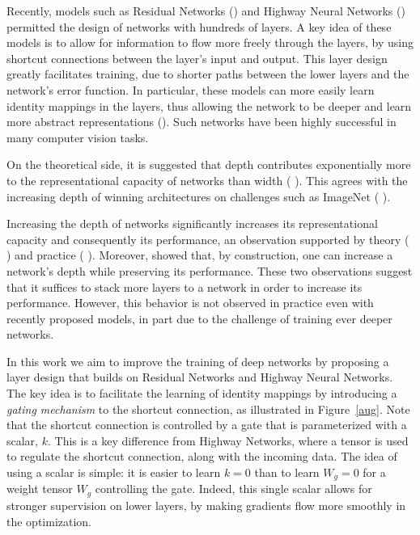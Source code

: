 \documentclass{article} %
\begin{document}
Recently, models such as Residual Networks (\cite{resnet1}) and Highway Neural Networks (\cite{highway}) permitted the design of networks with hundreds of layers. A key idea of these models is to allow for information to flow more freely through the layers, by using shortcut connections between the layer's input and output. This layer design greatly facilitates training, due to shorter paths between the lower layers and the network's error function. In particular, these models can more easily learn identity mappings in the layers, thus allowing the network to be deeper and learn more abstract representations (\cite{representations}). Such networks have been highly successful in many computer vision tasks. 

On the theoretical side, it is suggested that depth contributes exponentially more to the representational capacity of networks than width (\cite{exp1} \cite{exp2} \cite{exp3} \cite{exp4}). This agrees with the increasing depth of winning architectures on challenges such as ImageNet (\cite{resnet1} \cite{googlenet}). 


Increasing the depth of networks significantly increases its representational capacity and consequently its performance, an observation supported by theory (\cite{exp1} \cite{exp2} \cite{exp3} \cite{exp4}) and practice (\cite{resnet1} \cite{googlenet}). Moreover, \cite{resnet1} showed that, by construction, one can increase a network's depth while preserving its performance. These two observations suggest that it suffices to stack more layers to a network in order to increase its performance. However, this behavior is not observed in practice even with recently proposed models, in part due to the challenge of training ever deeper networks. 


In this work we aim to improve the training of deep networks by proposing a layer design that builds on Residual Networks and Highway Neural Networks. The key idea is to facilitate the learning of identity mappings by introducing a {\em gating mechanism} to the shortcut connection, as illustrated in Figure~\ref{aug}. Note that the shortcut connection is controlled by a gate that is parameterized with a scalar, $k$. This is a key difference from Highway Networks, where a tensor is used to regulate the shortcut connection, along with the incoming data. The idea of using a scalar is simple: it is easier to learn $k=0$ than to learn $W_g=0$ for a weight tensor $W_g$ controlling the gate. Indeed, this single scalar allows for stronger supervision on lower layers, by making gradients flow more smoothly in the optimization.
\end{document}
